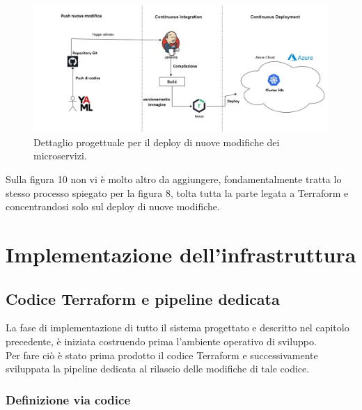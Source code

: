 \documentclass[a4paper,12pt]{report}
\begin{document}
\begin{figure}[h]
	\includegraphics[width=1.0\textwidth]{push_modifica}
    \caption{Dettaglio progettuale per il deploy di nuove modifiche dei microservizi.}
    \label{fig:push_modifica}
\end{figure}

Sulla figura 10 non vi è molto altro da aggiungere, fondamentalmente tratta lo stesso processo spiegato per la figura 8, tolta tutta la parte legata a Terraform e concentrandosi solo sul deploy di nuove modifiche.

\chapter{Implementazione dell'infrastruttura}
\section{Codice Terraform e pipeline dedicata}
La fase di implementazione di tutto il sistema progettato e descritto nel capitolo precedente, è iniziata costruendo prima l'ambiente operativo di sviluppo. \\
Per fare ciò è stato prima prodotto il codice Terraform e successivamente sviluppata la pipeline dedicata al rilascio delle modifiche di tale codice.

\subsection{Definizione via codice}
\end{document}
